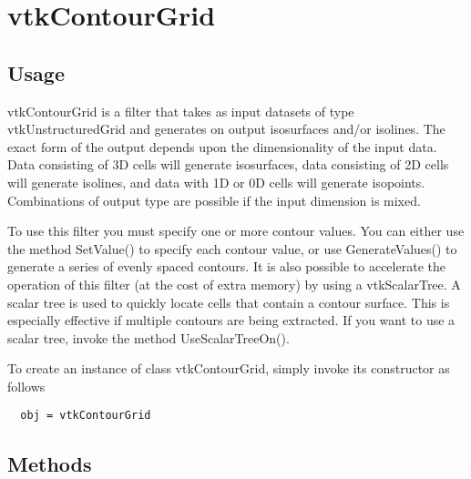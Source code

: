 \section{vtkContourGrid}

\subsection{Usage}

 vtkContourGrid is a filter that takes as input datasets of type
 vtkUnstructuredGrid and generates on output isosurfaces and/or
 isolines. The exact form of the output depends upon the dimensionality of
 the input data.  Data consisting of 3D cells will generate isosurfaces,
 data consisting of 2D cells will generate isolines, and data with 1D or 0D
 cells will generate isopoints. Combinations of output type are possible if
 the input dimension is mixed.

 To use this filter you must specify one or more contour values.
 You can either use the method SetValue() to specify each contour
 value, or use GenerateValues() to generate a series of evenly
 spaced contours. It is also possible to accelerate the operation of
 this filter (at the cost of extra memory) by using a
 vtkScalarTree. A scalar tree is used to quickly locate cells that
 contain a contour surface. This is especially effective if multiple
 contours are being extracted. If you want to use a scalar tree,
 invoke the method UseScalarTreeOn().


To create an instance of class vtkContourGrid, simply
invoke its constructor as follows
\begin{verbatim}
  obj = vtkContourGrid
\end{verbatim}
\subsection{Methods}

